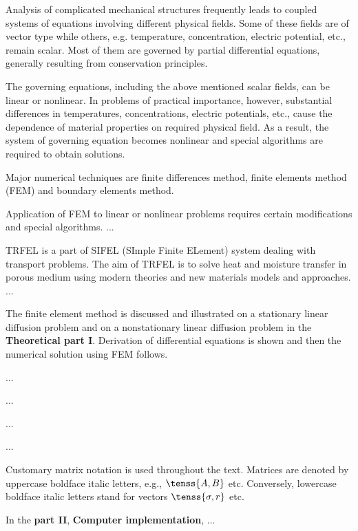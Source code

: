 Analysis of complicated mechanical structures frequently leads to coupled systems of equations involving 
different physical fields. Some of these fields are of vector type while others, e.g. temperature, concentration, 
electric potential, etc., remain scalar. Most of them are governed by partial differential equations, generally 
resulting from conservation principles.

The governing equations, including the above mentioned scalar fields, can be linear or nonlinear. In problems 
of practical importance, however, substantial differences in temperatures, concentrations, electric potentials, etc., 
cause the dependence of material properties on required physical field. As a result, the system of governing equation 
becomes nonlinear and special algorithms are required to obtain solutions.

Major numerical techniques are finite differences method, finite elements method (FEM) 
and boundary elements method.

Application of FEM to linear or nonlinear problems requires certain modifications and special algorithms. 
...

TRFEL is a part of SIFEL (SImple Finite ELement) system dealing with
transport problems. The aim of TRFEL is to solve heat and moisture transfer in porous medium 
using modern theories and new materials models and approaches.
...

The finite element method is discussed and illustrated on a stationary linear diffusion problem and on 
a nonstationary linear diffusion problem in the {\bf Theoretical part I}.
Derivation of differential equations is shown and then the numerical solution using FEM follows.

...

...

...

...

Customary matrix notation is used throughout the text. Matrices are denoted by uppercase 
boldface italic letters, e.g., $\tenss{A,B}$ etc. Conversely, lowercase boldface italic letters 
stand for vectors $\tenss{\sigma,r}$ etc.

In the {\bf part II}, {\bf Computer implementation}, ... 

